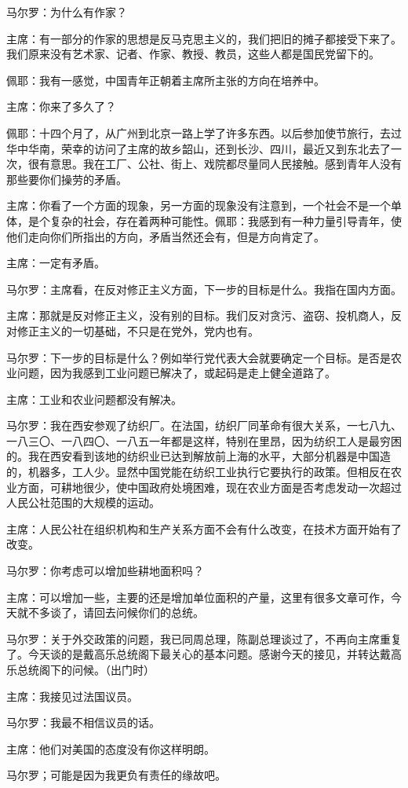 马尔罗：为什么有作家？

主席：有一部分的作家的思想是反马克思主义的，我们把旧的摊子都接受下来了。我们原来没有艺术家、记者、作家、教授、教员，这些人都是国民党留下的。

佩耶：我有一感觉，中国青年正朝着主席所主张的方向在培养中。

主席：你来了多久了？

佩耶：十四个月了，从广州到北京一路上学了许多东西。以后参加使节旅行，去过华中华南，荣幸的访问了主席的故乡韶山，还到长沙、四川，最近又到东北去了一次，很有意思。我在工厂、公社、街上、戏院都尽量同人民接触。感到青年人没有那些要你们操劳的矛盾。

主席：你看了一个方面的现象，另一方面的现象没有注意到，一个社会不是一个单体，是个复杂的社会，存在着两种可能性。佩耶：我感到有一种力量引导青年，使他们走向你们所指出的方向，矛盾当然还会有，但是方向肯定了。

主席：一定有矛盾。

马尔罗：主席看，在反对修正主义方面，下一步的目标是什么。我指在国内方面。

主席：那就是反对修正主义，没有别的目标。我们反对贪污、盗窃、投机商人，反对修正主义的一切基础，不只是在党外，党内也有。

马尔罗：下一步的目标是什么？例如举行党代表大会就要确定一个目标。是否是农业问题，因为我感到工业问题已解决了，或起码是走上健全道路了。

主席：工业和农业问题都没有解决。

马尔罗：我在西安参观了纺织厂。在法国，纺织厂同革命有很大关系，一七八九、一八三〇、一八四〇、一八五一年都是这样，特别在里昂，因为纺织工人是最穷困的。我在西安看到该地的纺织业已达到解放前上海的水平，大部分机器是中国造的，机器多，工人少。显然中国党能在纺织工业执行它要执行的政策。但相反在农业方面，可耕地很少，使中国政府处境困难，现在农业方面是否考虑发动一次超过人民公社范围的大规模的运动。

主席：人民公社在组织机构和生产关系方面不会有什么改变，在技术方面开始有了改变。

马尔罗：你考虑可以增加些耕地面积吗？

主席：可以增加一些，主要的还是增加单位面积的产量，这里有很多文章可作，今天就不多谈了，请回去问候你们的总统。

马尔罗：关于外交政策的问题，我已同周总理，陈副总理谈过了，不再向主席重复了。今天谈的是戴高乐总统阁下最关心的基本问题。感谢今天的接见，并转达戴高乐总统阁下的问候。（出门时）

主席：我接见过法国议员。

马尔罗：我最不相信议员的话。

主席：他们对美国的态度没有你这样明朗。

马尔罗；可能是因为我更负有责任的缘故吧。


